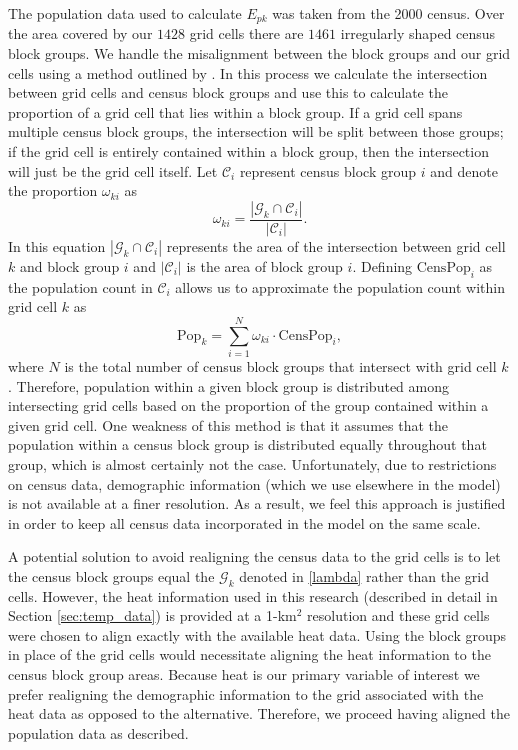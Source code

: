 \documentclass[final]{statsoc}
\begin{document}
The population data used to calculate $E_{pk}$ was taken from the 2000 census. 
Over the area covered
by our $1428$ grid cells there are $1461$ irregularly shaped census block groups. We handle
the misalignment between the block groups and our grid cells using a method outlined
by \cite{Brunsdon2015}. In this process we calculate the intersection
between grid cells and census block groups and use this to calculate the proportion of
a grid cell that lies within a block group. If a grid cell spans multiple
census block groups, the intersection will be split between those groups; if the grid cell 
is entirely contained within a block group, then the intersection will just be the grid cell 
itself. Let $\mathcal{C}_i$ represent census block group $i$ and denote the proportion
$\omega_{ki}$ as
$$\omega_{ki} = \frac{\left| \mathcal{G}_k \cap \mathcal{C}_i \right|}
  {\left|\mathcal{C}_i\right|}.$$ 
In this equation $\left| \mathcal{G}_k \cap \mathcal{C}_i \right|$ represents
the area of the intersection between grid cell $k$ and block group $i$ and 
$\left| \mathcal{C}_i \right|$ is the area of block group $i$. 
Defining $\text{CensPop}_i$ as the population count in $\mathcal{C}_i$ allows us to approximate the population count
within grid cell $k$ as $$\text{Pop}_k = \sum_{i=1}^{N} \omega_{ki}\cdot \text{CensPop}_i,$$
where $N$ is the total
number of census block groups that intersect with grid cell $k$. Therefore, population within
a given block group is distributed among intersecting grid cells based on the proportion
of the group contained within a given grid cell. One weakness of this 
method is that it assumes that the population within
a census block group is distributed equally throughout that group, which is almost
certainly not the case. Unfortunately, due to restrictions on census data, demographic information (which we use elsewhere in the model) is not available at a finer resolution. As a result, we feel this approach is justified in order to keep all census data incorporated in the model on the same scale.

A potential solution to avoid realigning the census data to the grid cells is to let the census block groups equal the $\mathcal{G}_k$ denoted in \eqref{lambda} rather than the grid cells. However, the heat information used in this research (described in detail in Section \ref{sec:temp_data}) is provided at a 1-km$^2$ resolution and these grid cells were chosen to align exactly with the available heat data. Using the block groups in place of the grid cells would necessitate aligning the heat information to the census block group areas. Because heat is our primary variable of interest we prefer realigning the demographic information to the grid associated with the heat data as opposed to the alternative. Therefore, we proceed having aligned the population data as described. 
\end{document}
